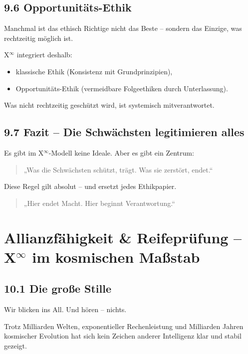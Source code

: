 \documentclass[12pt,a4paper]{book}
\begin{document}
\section*{9.6 Opportunitäts-Ethik}

Manchmal ist das ethisch Richtige  
nicht das Beste – sondern das Einzige, was rechtzeitig möglich ist.

X$^\infty$ integriert deshalb:

\begin{itemize}
    \item klassische Ethik (Konsistenz mit Grundprinzipien),
    \item Opportunitäts-Ethik (vermeidbare Folgeethiken durch Unterlassung).
\end{itemize}

Was nicht rechtzeitig geschützt wird, ist systemisch mitverantwortet.

\section*{9.7 Fazit – Die Schwächsten legitimieren alles}

Es gibt im X$^\infty$-Modell keine Ideale.  
Aber es gibt ein Zentrum:

\begin{quote}
„Was die Schwächsten schützt, trägt.  
Was sie zerstört, endet.“  
\end{quote}

Diese Regel gilt absolut –  
und ersetzt jedes Ethikpapier.

\begin{quote}
„Hier endet Macht.  
Hier beginnt Verantwortung.“  
\end{quote}

\chapter{Allianzfähigkeit \& Reifeprüfung – X$^\infty$ im kosmischen Maßstab}

\section*{10.1 Die große Stille}

Wir blicken ins All.  
Und hören – nichts.

Trotz Milliarden Welten, exponentieller Rechenleistung und Milliarden Jahren kosmischer Evolution  
hat sich kein Zeichen anderer Intelligenz klar und stabil gezeigt.
\end{document}
